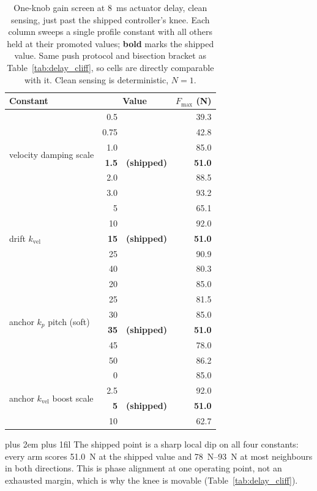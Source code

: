 \documentclass[conference]{IEEEtran}
\newcommand{\tabnote}{\par\leftskip=0pt\rightskip=0pt plus 2em%
  \parfillskip=0pt plus 1fil\relax}
\begin{document}
\begin{table}[t]
\centering
\caption{One-knob gain screen at \SI{8}{ms} actuator delay, clean sensing, just past the shipped controller's knee. Each column sweeps a single profile constant with all others held at their promoted values; \textbf{bold} marks the shipped value. Same push protocol and bisection bracket as Table~\ref{tab:delay_cliff}, so cells are directly comparable with it. Clean sensing is deterministic, $N{=}1$.}
\label{tab:delay_screen}
\footnotesize
\setlength{\tabcolsep}{4pt}
\begin{tabular*}{\linewidth}{@{\extracolsep{\fill}}lr@{\;}lr@{}}
\toprule
Constant & \multicolumn{2}{c}{Value} & $F_{\max}$ (N) \\
\midrule
\multirow{6}{*}{velocity damping scale}
  & 0.5  &      & 39.3 \\
  & 0.75 &      & 42.8 \\
  & 1.0  &      & 85.0 \\
  & \textbf{1.5} & \textbf{(shipped)} & \textbf{51.0} \\
  & 2.0  &      & 88.5 \\
  & 3.0  &      & 93.2 \\
\midrule
\multirow{5}{*}{drift $k_{\text{vel}}$}
  & 5    &      & 65.1 \\
  & 10   &      & 92.0 \\
  & \textbf{15} & \textbf{(shipped)} & \textbf{51.0} \\
  & 25   &      & 90.9 \\
  & 40   &      & 80.3 \\
\midrule
\multirow{6}{*}{anchor $k_p$ pitch (soft)}
  & 20   &      & 85.0 \\
  & 25   &      & 81.5 \\
  & 30   &      & 85.0 \\
  & \textbf{35} & \textbf{(shipped)} & \textbf{51.0} \\
  & 45   &      & 78.0 \\
  & 50   &      & 86.2 \\
\midrule
\multirow{4}{*}{anchor $k_{\text{vel}}$ boost scale}
  & 0    &      & 85.0 \\
  & 2.5  &      & 92.0 \\
  & \textbf{5} & \textbf{(shipped)} & \textbf{51.0} \\
  & 10   &      & 62.7 \\
\bottomrule
\end{tabular*}
\vspace{2pt}\tabnote\noindent
The shipped point is a sharp local dip on all four constants: every arm scores \SI{51.0}{N} at the shipped value and \SIrange{78}{93}{N} at most neighbours in both directions. This is phase alignment at one operating point, not an exhausted margin, which is why the knee is movable (Table~\ref{tab:delay_cliff}).
\end{table}
\end{document}
